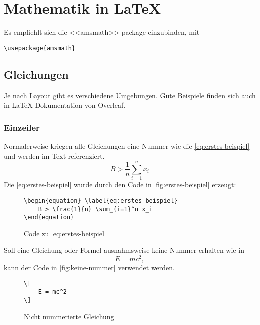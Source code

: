 \chapter{Mathematik in \LaTeX}\label{sec:mathezeugs}
Es empfiehlt sich die <<amsmath>> package einzubinden, mit
\begin{verbatim}
\usepackage{amsmath}
\end{verbatim}

\section{Gleichungen}
Je nach Layout gibt es verschiedene Umgebungen. Gute Beispiele finden sich auch
in \LaTeX{}-Dokumentation von Overleaf\cite{overleaf-equations}.
\subsection{Einzeiler}
Normalerweise kriegen alle Gleichungen eine Nummer wie die
\autoref{eq:erstes-beispiel} und werden im Text referenziert.
\begin{equation} \label{eq:erstes-beispiel}
	B > \frac{1}{n} \sum_{i=1}^n x_i
\end{equation}
%
Die \autoref{eq:erstes-beispiel} wurde durch den Code in
\autoref{fig:erstes-beispiel} erzeugt:
\begin{figure}[ht]
\centering
\begin{minipage}{0.8\textwidth}
\begin{verbatim}
\begin{equation} \label{eq:erstes-beispiel}
    B > \frac{1}{n} \sum_{i=1}^n x_i
\end{equation}
\end{verbatim}
\end{minipage}
\caption{Code zu \autoref{eq:erstes-beispiel}}
\label{fig:erstes-beispiel}
\end{figure}
%
%
Soll eine Gleichung oder Formel ausnahmsweise keine Nummer erhalten wie in
\[
	E = mc^2,
\]
kann der Code in \autoref{fig:keine-nummer} verwendet werden.
\begin{figure}[ht]
\centering
\begin{minipage}{0.8\textwidth}
\begin{verbatim}
\[
    E = mc^2
\]
\end{verbatim}
\end{minipage}
\caption{Nicht nummerierte Gleichung}
\label{fig:keine-nummer}
\end{figure}

